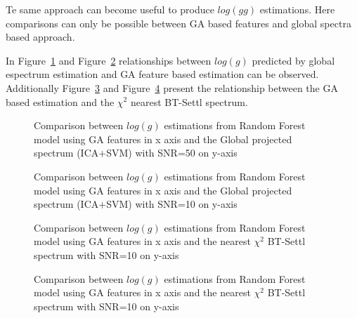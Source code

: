 {
Te same approach can become useful to produce $log(gg)$ estimations. 
Here comparisons can only be possible between GA based features and
global spectra based approach.

In Figure~\ref{fig:Gbp_Gga_50} and Figure~\ref{fig:Gbp_Gga_10} 
relationships between $log(g)$ predicted by global espectrum estimation 
and GA feature based estimation can be observed.
Additionally Figure~\ref{fig:Gch_Gga_50} and Figure~\ref{fig:Gch_Gga_10}
present the relationship between the GA based estimation and the 
$\chi^2$ nearest BT-Settl spectrum.

\begin {figure}
 \begin{center}
 \caption{Comparison between $log(g)$ estimations from 
 Random Forest model using GA features  in x axis and 
 the Global projected spectrum (ICA+SVM) with SNR=50 on y-axis}
 \label{fig:Gbp_Gga_50}
 \end{center}
\end {figure}

\begin {figure}
 \begin{center}
 \caption{Comparison between $log(g)$ estimations from 
 Random Forest model using GA features  in x axis and 
 the Global projected spectrum (ICA+SVM) with SNR=10 on y-axis}
 \label{fig:Gbp_Gga_10}
 \end{center}
\end {figure}

\begin {figure}
 \begin{center}
 \caption{Comparison between $log(g)$ estimations from 
 Random Forest model using GA features  in x axis and 
 the nearest $\chi^2$ BT-Settl spectrum with SNR=10 on y-axis}
 \label{fig:Gch_Gga_50}
 \end{center}
\end {figure}

\begin {figure}
 \begin{center}
 \caption{Comparison between $log(g)$ estimations from 
 Random Forest model using GA features  in x axis and 
 the nearest $\chi^2$ BT-Settl spectrum with SNR=10 on y-axis}
 \label{fig:Gch_Gga_10}
 \end{center}
\end {figure}


}

